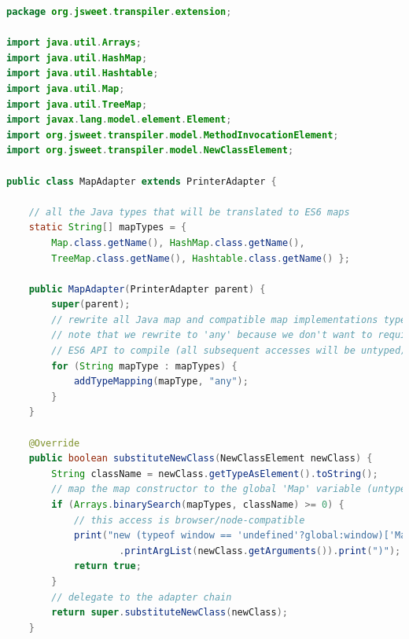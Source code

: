 \documentclass[a4paper]{report}
\begin{document}
\begin{lstlisting}[language=Java]
package org.jsweet.transpiler.extension;

import java.util.Arrays;
import java.util.HashMap;
import java.util.Hashtable;
import java.util.Map;
import java.util.TreeMap;
import javax.lang.model.element.Element;
import org.jsweet.transpiler.model.MethodInvocationElement;
import org.jsweet.transpiler.model.NewClassElement;

public class MapAdapter extends PrinterAdapter {

	// all the Java types that will be translated to ES6 maps
	static String[] mapTypes = { 
		Map.class.getName(), HashMap.class.getName(), 
		TreeMap.class.getName(), Hashtable.class.getName() };

	public MapAdapter(PrinterAdapter parent) {
		super(parent);
		// rewrite all Java map and compatible map implementations types
		// note that we rewrite to 'any' because we don't want to require the
		// ES6 API to compile (all subsequent accesses will be untyped)
		for (String mapType : mapTypes) {
			addTypeMapping(mapType, "any");
		}
	}

	@Override
	public boolean substituteNewClass(NewClassElement newClass) {
		String className = newClass.getTypeAsElement().toString();
		// map the map constructor to the global 'Map' variable (untyped access)
		if (Arrays.binarySearch(mapTypes, className) >= 0) {
			// this access is browser/node-compatible
			print("new (typeof window == 'undefined'?global:window)['Map'](")
					.printArgList(newClass.getArguments()).print(")");
			return true;
		}
		// delegate to the adapter chain
		return super.substituteNewClass(newClass);
	}


\end{lstlisting}
\end{document}
